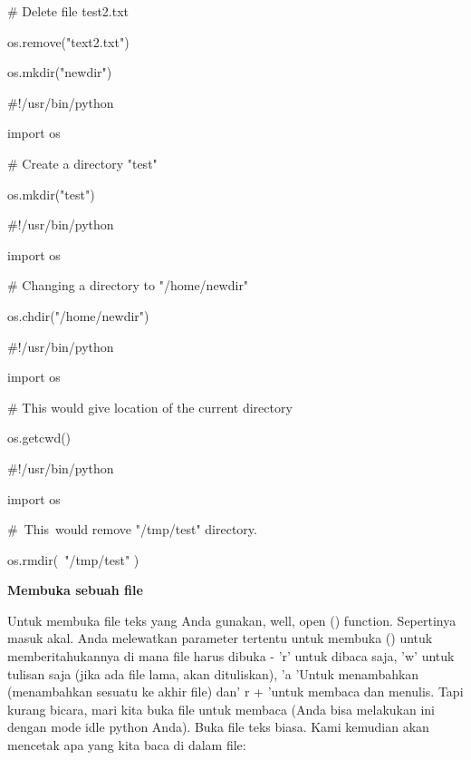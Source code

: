 \noindent 
$  \#  $ Delete file test2.txt \par
\noindent 
os.remove("text2.txt") \par
\vspace{12pt}
\noindent 
os.mkdir("newdir") \par
\vspace{12pt}
\noindent 
$  \#  $!/usr/bin/python \par
\noindent 
import os \par
\vspace{12pt}
\noindent 
$  \#  $ Create a directory "test" \par
\noindent 
os.mkdir("test") \par
\vspace{12pt}
\noindent 
$  \#  $!/usr/bin/python \par
\noindent 
import os \par
\vspace{12pt}
\noindent 
$  \#  $ Changing a directory to "/home/newdir" \par
\noindent 
os.chdir("/home/newdir") \par
\vspace{12pt}
\noindent 
$  \#  $!/usr/bin/python \par
\noindent 
import os \par
\vspace{12pt}
\noindent 
$  \#  $ This would give location of the current directory \par
\noindent 
os.getcwd() \par
\vspace{12pt}
\noindent 
$  \#  $!/usr/bin/python \par
\noindent 
import os \par
\vspace{12pt}
\noindent 
$  \#  $~This~would  remove "/tmp/test"  directory. \par
\noindent 
os.rmdir(~"/tmp/test"  ) \par
\vspace{12pt}
\vspace{12pt}
\noindent 
{\fontsize{14pt}{14pt}\selectfont \textbf{Membuka sebuah file} \\} \par
\vspace{12pt}
Untuk membuka file teks yang Anda gunakan, well, open () function. Sepertinya masuk akal. Anda melewatkan parameter tertentu untuk membuka () untuk memberitahukannya di mana file harus dibuka - 'r' untuk dibaca saja, 'w' untuk tulisan saja (jika ada file lama, akan dituliskan), 'a 'Untuk menambahkan (menambahkan sesuatu ke akhir file) dan' r + 'untuk membaca dan menulis. Tapi kurang bicara, mari kita buka file untuk membaca (Anda bisa melakukan ini dengan mode idle python Anda). Buka file teks biasa. Kami kemudian akan mencetak apa yang kita baca di dalam file: \par
